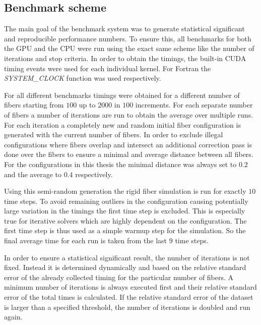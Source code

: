 \documentclass[a4paper,11pt]{kth-mag}
\begin{document}
\subsection{Benchmark scheme}

The main goal of the benchmark system was to generate statistical significant and reproducible performance numbers. To ensure this, all benchmarks for both the GPU and the CPU were run using the exact same scheme like the number of iterations and stop criteria. In order to obtain the timings, the built-in CUDA timing events were used for each individual kernel. For Fortran the \emph{SYSTEM\_CLOCK} function was used respectively.

For all different benchmarks timings were obtained for a different number of fibers starting from $100$ up to $2000$ in $100$ increments. For each separate number of fibers a number of iterations are run to obtain the average over multiple runs. For each iteration a completely new and random initial fiber configuration is generated with the current number of fibers. In order to exclude illegal configurations where fibers overlap and intersect an additional correction pass is done over the fibers to ensure a minimal and average distance between all fibers. For the configurations in this thesis the minimal distance was always set to $0.2$ and the average to $0.4$ respectively.

Using this semi-random generation the rigid fiber simulation is run for exactly $10$ time steps. To avoid remaining outliers in the configuration causing potentially large variation in the timings the first time step is excluded. This is especially true for iterative solvers which are highly dependent on the configuration. The first time step is thus used as a simple warmup step for the simulation. So the final average time for each run is taken from the last $9$ time steps.

In order to ensure a statistical significant result, the number of iterations is not fixed. Instead it is determined dynamically and based on the relative standard error of the already collected timing for the particular number of fibers. A minimum number of iterations is always executed first and their relative standard error of the total times is calculated. If the relative standard error of the dataset is larger than a specified threshold, the number of iterations is doubled and run again.
\end{document}
